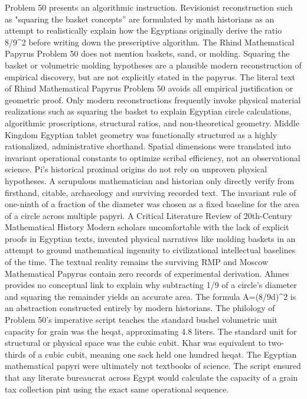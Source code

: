 Problem 50 presents an algorithmic instruction. Revisionist reconstruction such as "squaring the basket concepts” are formulated by math historians as an attempt to realistically explain how the Egyptians originally derive the ratio 8/9^2 before writing down the prescriptive algorithm. The Rhind Mathematical Papyrus Problem 50 does not mention baskets, sand, or molding. Squaring the basket or volumetric molding hypotheses are a plausible modern reconstruction of empirical discovery, but are not explicitly stated in the papyrus. 
The literal text of Rhind Mathematical Papyrus Problem 50 avoids all empirical justification or geometric proof. Only modern reconstructions frequently invoke physical material realizations such as squaring the basket to explain Egyptian circle calculations, algorithmic proscriptions, structural ratios, and non-theoretical geometry. Middle Kingdom Egyptian tablet geometry was functionally structured as a highly rationalized, administrative shorthand. Spatial dimensions were translated into invariant operational constants to optimize scribal efficiency, not an observational science. Pi’s historical proximal origins do not rely on unproven physical hypotheses. A scrupulous mathematician and historian only directly verify from firsthand, citable, archaeology and surviving recorded text. The invariant rule of one-ninth of a fraction of the diameter was chosen as a fixed baseline for the area of a circle across multiple papyri. 
A Critical Literature Review of 20th-Century Mathematical History
Modern scholars uncomfortable with the lack of explicit proofs in Egyptian texts, invented physical narratives like molding baskets in an attempt to ground mathematical ingenuity to civilizational intellectual baselines of the time. The textual reality remains the surviving RMP and Moscow Mathematical Papyrus contain zero records of experimental derivation. Ahmes provides no conceptual link to explain why subtracting 1/9 of a circle’s diameter and squaring the remainder yields an accurate area. The formula A=(8/9d)^2 is an abstraction constructed entirely by modern historians. The philology of Problem 50’s imperative script teaches the standard bushel volumetric unit capacity for grain was the heqat, approximating 4.8 liters. The standard unit for structural or physical space was the cubic cubit. Khar was equivalent to two-thirds of a cubic cubit, meaning one sack held one hundred heqat. The Egyptian mathematical papyri were ultimately not textbooks of science. The script ensured that any literate bureaucrat across Egypt would calculate the capacity of a grain tax collection pint using the exact same operational sequence. 
